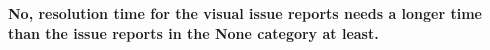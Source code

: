 


\summarybox
{\bf No, resolution time for the visual issue reports needs a longer time than the issue reports in the None category at least.
}


